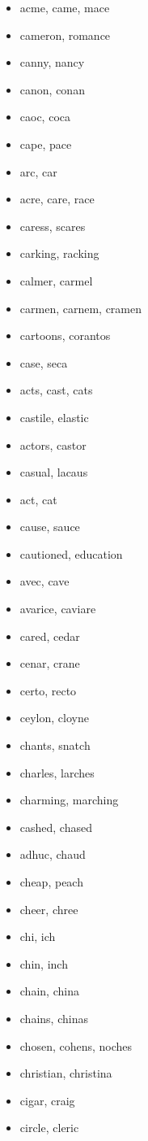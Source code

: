 \documentclass[a4wide,11pt]{report}
\begin{document}
\begin{itemize}
  \item acme, came, mace
  \item cameron, romance
  \item canny, nancy
  \item canon, conan
  \item caoc, coca
  \item cape, pace
  \item arc, car
  \item acre, care, race
  \item caress, scares
  \item carking, racking
  \item calmer, carmel
  \item carmen, carnem, cramen
  \item cartoons, corantos
  \item case, seca
  \item acts, cast, cats
  \item castile, elastic
  \item actors, castor
  \item casual, lacaus
  \item act, cat
  \item cause, sauce
  \item cautioned, education
  \item avec, cave
  \item avarice, caviare
  \item cared, cedar
  \item cenar, crane
  \item certo, recto
  \item ceylon, cloyne
  \item chants, snatch
  \item charles, larches
  \item charming, marching
  \item cashed, chased
  \item adhuc, chaud
  \item cheap, peach
  \item cheer, chree
  \item chi, ich
  \item chin, inch
  \item chain, china
  \item chains, chinas
  \item chosen, cohens, noches
  \item christian, christina
  \item cigar, craig
  \item circle, cleric

\end{itemize}
\end{document}
